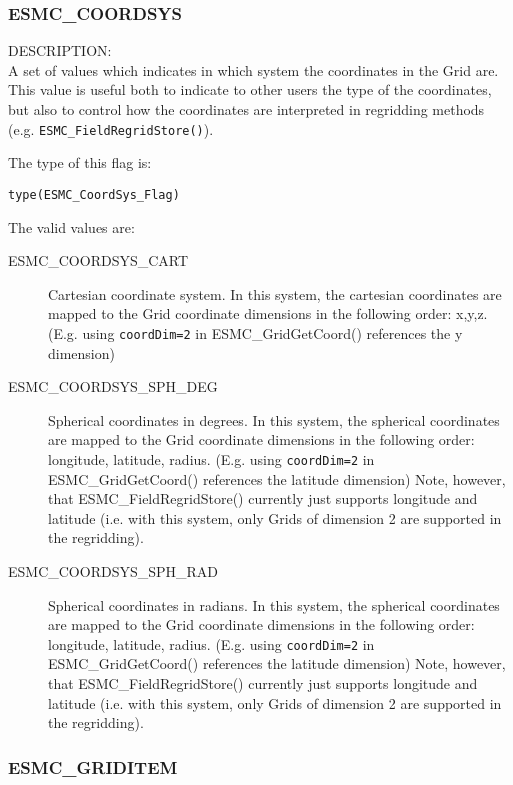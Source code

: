 
\subsubsection{ESMC\_COORDSYS}
\label{const:ccoordsys}

{\sf DESCRIPTION:\\}
 A set of values which indicates in which system the coordinates in the Grid are. This value is useful both to indicate to 
other users the type of the coordinates, but also to control how the coordinates are interpreted in regridding methods 
(e.g. {\tt ESMC\_FieldRegridStore()}).

The type of this flag is:

{\tt type(ESMC\_CoordSys\_Flag)}

The valid values are:
\begin{description}
\item [ESMC\_COORDSYS\_CART] Cartesian coordinate system. In this system, the cartesian coordinates are mapped to the Grid coordinate dimensions in the following order: x,y,z. (E.g. using {\tt coordDim=2} in ESMC\_GridGetCoord() references the y dimension) 

\item [ESMC\_COORDSYS\_SPH\_DEG] Spherical coordinates in degrees. In this system, the spherical coordinates are mapped to the Grid coordinate dimensions in the following order: longitude, latitude, radius. (E.g. using {\tt coordDim=2} in ESMC\_GridGetCoord() references the latitude dimension) Note, however, that ESMC\_FieldRegridStore() currently just supports longitude and latitude (i.e. with this system, only Grids of dimension 2 are supported in the regridding).

\item [ESMC\_COORDSYS\_SPH\_RAD] Spherical coordinates in radians. In this system, the spherical coordinates are mapped to the Grid coordinate dimensions in the following order: longitude, latitude, radius. (E.g. using {\tt coordDim=2} in ESMC\_GridGetCoord() references the latitude dimension) Note, however, that ESMC\_FieldRegridStore() currently just supports longitude and latitude (i.e. with this system, only Grids of dimension 2 are supported in the regridding).

\end{description}


\subsubsection{ESMC\_GRIDITEM}
\label{const:cgriditem}

